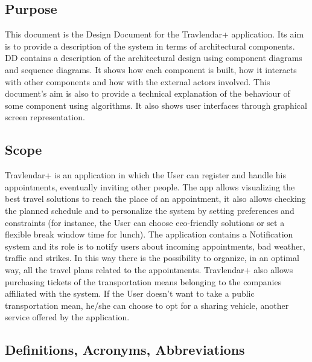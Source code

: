 \subsection{Purpose}
This document is the Design Document for the Travlendar+ application. Its aim is to provide a description of the system in terms of architectural components. DD contains a description of the architectural design using component diagrams and sequence diagrams. It shows how each component is built, how it interacts with other components and how with the external actors involved. This document's aim is also to provide a technical explanation of the behaviour of some component using algorithms. It also shows user interfaces through graphical screen representation.
	
\subsection{Scope}
Travlendar+ is an application in which the User can register and handle his appointments, eventually inviting other people. The app allows visualizing the best travel solutions to reach the place of an appointment, it also allows checking the planned schedule and to personalize the system by setting preferences and constraints (for instance, the User can choose eco-friendly  solutions or set a flexible break window time for lunch). \newline 
The application contains a Notification system and its role is to notify users about incoming appointments, bad weather, traffic and strikes. In this way there is the possibility to organize, in an optimal way, all the travel plans related to the appointments. \newline 
Travlendar+ also allows purchasing tickets of the transportation means belonging to the companies affiliated with the system. If the User doesn't want to take a public transportation mean, he/she can choose to opt for a sharing vehicle, another service offered by the application. 

\subsection{Definitions, Acronyms, Abbreviations}
